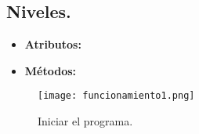 \documentclass{article}
\begin{document}
\subsection{Niveles.}\label{niveles}
\begin{itemize}
  \item \textbf{Atributos:} 
  
  \item \textbf{Métodos:} 
\end{itemize}








\begin{figure}[h]
\texttt{[image: funcionamiento1.png]}
\centering
\caption{Iniciar el programa.}
\label{fig:func1}
\end{figure}
\end{document}

